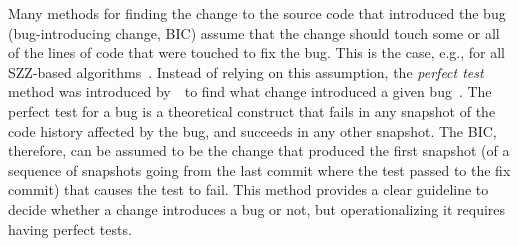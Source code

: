 Many methods for finding the change to the source code that introduced the bug (bug-introducing change, BIC) assume that the change should touch some or all of the lines of code that were touched to fix the bug. This is the case, e.g., for all SZZ-based algorithms~\cite{sliwerski2005changes}. 
Instead of relying on this assumption, the \emph{perfect test} method was introduced by~\gema~to find what change introduced a given bug~\cite{rodriguez2020bugs}. 
The perfect test for a bug is a theoretical construct that fails in any snapshot of the code history affected by the bug, and succeeds in any other snapshot. 
The BIC, therefore, can be assumed to be the change that produced the first snapshot (of a sequence of snapshots going from the last commit where the test passed to the fix commit) that causes the test to fail. 
This method provides a clear guideline to decide whether a change introduces a bug or not, but operationalizing it requires having %
perfect tests.%


